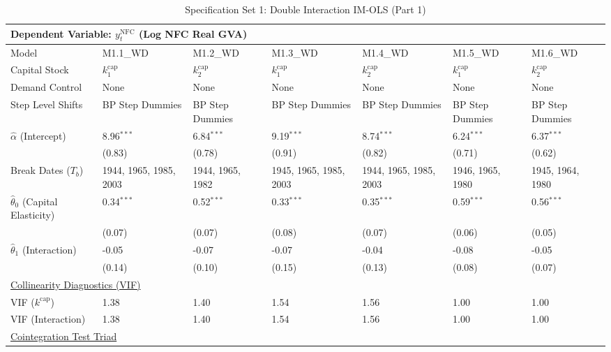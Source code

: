 \begin{table}[H]
\centering
\caption{Specification Set 1: Double Interaction IM-OLS (Part 1)}
\label{tab:paper_spec_set_1_1}
\scriptsize
\begin{tabular}{p{3.8cm}p{1.35cm}p{1.35cm}p{1.35cm}p{1.35cm}p{1.35cm}p{1.35cm}}
\toprule
\multicolumn{7}{l}{\textbf{Dependent Variable: $y_t^{\text{NFC}}$ (Log NFC Real GVA)}} \\
\midrule
Model & M1.1\_WD & M1.2\_WD & M1.3\_WD & M1.4\_WD & M1.5\_WD & M1.6\_WD  \\
Capital Stock & $k^{\text{cap}}_1$ & $k^{\text{cap}}_2$ & $k^{\text{cap}}_1$ & $k^{\text{cap}}_2$ & $k^{\text{cap}}_1$ & $k^{\text{cap}}_2$  \\
Demand Control & None & None & None & None & None & None  \\
Step Level Shifts & BP Step Dummies & BP Step Dummies & BP Step Dummies & BP Step Dummies & BP Step Dummies & BP Step Dummies  \\
\midrule
$\hat{\alpha}$ (Intercept)  & 8.96$^{***}$ & 6.84$^{***}$ & 9.19$^{***}$ & 8.74$^{***}$ & 6.24$^{***}$ & 6.37$^{***}$  \\
 & {\scriptsize (0.83)} & {\scriptsize (0.78)} & {\scriptsize (0.91)} & {\scriptsize (0.82)} & {\scriptsize (0.71)} & {\scriptsize (0.62)}  \\
Break Dates ($T_b$) & 1944, 1965, 1985, 2003 & 1944, 1965, 1982 & 1945, 1965, 1985, 2003 & 1944, 1965, 1985, 2003 & 1946, 1965, 1980 & 1945, 1964, 1980  \\
[1ex]
$\hat{\theta}_0$ (Capital Elasticity)  & 0.34$^{***}$ & 0.52$^{***}$ & 0.33$^{***}$ & 0.35$^{***}$ & 0.59$^{***}$ & 0.56$^{***}$  \\
 & {\scriptsize (0.07)} & {\scriptsize (0.07)} & {\scriptsize (0.08)} & {\scriptsize (0.07)} & {\scriptsize (0.06)} & {\scriptsize (0.05)}  \\
$\hat{\theta}_1$ (Interaction)  & -0.05 & -0.07 & -0.07 & -0.04 & -0.08 & -0.05  \\
 & {\scriptsize (0.14)} & {\scriptsize (0.10)} & {\scriptsize (0.15)} & {\scriptsize (0.13)} & {\scriptsize (0.08)} & {\scriptsize (0.07)}  \\
\midrule
\multicolumn{7}{l}{\underline{Collinearity Diagnostics (VIF)}} \\
VIF ($k^{\text{cap}}$) & 1.38 & 1.40 & 1.54 & 1.56 & 1.00 & 1.00  \\
VIF (Interaction) & 1.38 & 1.40 & 1.54 & 1.56 & 1.00 & 1.00  \\
\midrule
\multicolumn{7}{l}{\underline{Cointegration Test Triad}} \\

\end{tabular}
\end{table}
